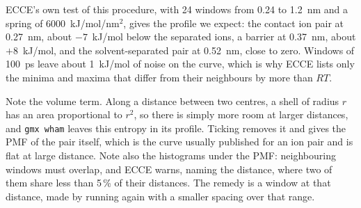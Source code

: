 ECCE's own test of this procedure, with 24 windows from 0.24 to 1.2~nm and a spring of 6000~kJ/mol/nm$^2$, gives the profile we expect: the contact ion pair at 0.27~nm, about $-7$~kJ/mol below the separated ions, a barrier at 0.37~nm, about $+8$~kJ/mol, and the solvent-separated pair at 0.52~nm, close to zero. Windows of 100~ps leave about 1~kJ/mol of noise on the curve, which is why ECCE lists only the minima and maxima that differ from their neighbours by more than $RT$.

Note the volume term. Along a distance between two centres, a shell of radius $r$ has an area proportional to $r^2$, so there is simply more room at larger distances, and \texttt{gmx wham} leaves this entropy in its profile. Ticking  removes it and gives the PMF of the pair itself, which is the curve usually published for an ion pair and is flat at large distance. Note also the histograms under the PMF: neighbouring windows must overlap, and ECCE warns, naming the distance, where two of them share less than 5\,\% of their distances. The remedy is a window at that distance, made by running  again with a smaller spacing over that range.

